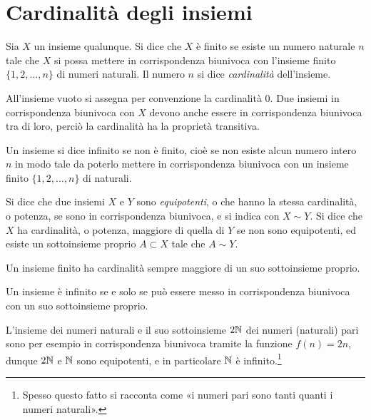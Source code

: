 \section{Cardinalità degli insiemi}
\begin{definizione}
Sia $X$ un insieme qualunque. Si dice che $X$ è finito se esiste un numero naturale $n$ tale che $X$ si possa mettere in corrispondenza biunivoca con l'insieme finito $\{1,2,\dots,n\}$ di numeri naturali. Il numero $n$ si dice \emph{cardinalità} dell'insieme.
\end{definizione}
All'insieme vuoto si assegna per convenzione la cardinalità 0.
Due insiemi in corrispondenza biunivoca con $X$ devono anche essere in corrispondenza biunivoca tra di loro, perciò la cardinalità ha la proprietà transitiva.
\begin{definizione}
Un insieme si dice infinito se non è finito, cioè se non esiste alcun numero intero $n$ in modo tale da poterlo mettere in corrispondenza biunivoca con un insieme finito $\{1,2,\dots,n\}$ di naturali.
\end{definizione}
\begin{definizione}
Si dice che due insiemi $X$ e $Y$ sono \emph{equipotenti}, o che hanno la stessa cardinalità, o potenza, se sono in corrispondenza biunivoca, e si indica con $X\sim Y$.
Si dice che $X$ ha cardinalità, o potenza, maggiore di quella di $Y$ se non sono equipotenti, ed esiste un sottoinsieme proprio $A\subset X$ tale che $A\sim Y$.
\end{definizione}
Un insieme finito ha cardinalità sempre maggiore di un suo sottoinsieme proprio.

\begin{teorema}
Un insieme è infinito se e solo se può essere messo in corrispondenza biunivoca con un suo sottoinsieme proprio.
\end{teorema}
L'insieme dei numeri naturali e il suo sottoinsieme $2\mathbb{N}$ dei numeri (naturali) pari sono per esempio in corrispondenza biunivoca tramite la funzione $f(n)=2n$, dunque $2\mathbb{N}$ e $\mathbb{N}$ sono equipotenti, e in particolare $\mathbb{N}$ è infinito.\footnote{
	Spesso questo fatto si racconta come «i numeri pari sono tanti quanti i numeri naturali».
}


